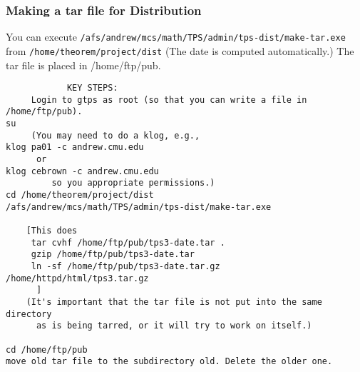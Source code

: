 \subsubsection{Making a tar file for Distribution} 

You can execute
{\tt /afs/andrew/mcs/math/TPS/admin/tps-dist/make-tar.exe}
from {\tt /home/theorem/project/dist}
(The date is computed automatically.)
The tar file is placed in /home/ftp/pub.

\begin{verbatim}
			KEY STEPS:
     Login to gtps as root (so that you can write a file in /home/ftp/pub).
su
     (You may need to do a klog, e.g., 
klog pa01 -c andrew.cmu.edu
      or 
klog cebrown -c andrew.cmu.edu
         so you appropriate permissions.)
cd /home/theorem/project/dist
/afs/andrew/mcs/math/TPS/admin/tps-dist/make-tar.exe

    [This does
     tar cvhf /home/ftp/pub/tps3-date.tar .
     gzip /home/ftp/pub/tps3-date.tar
     ln -sf /home/ftp/pub/tps3-date.tar.gz /home/httpd/html/tps3.tar.gz
      ]
    (It's important that the tar file is not put into the same directory
      as is being tarred, or it will try to work on itself.)

cd /home/ftp/pub
move old tar file to the subdirectory old. Delete the older one.

\end{verbatim}




